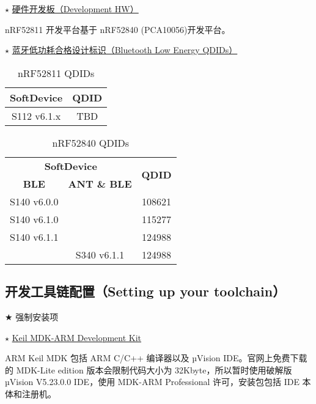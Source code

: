 \documentclass{WHUResearch}  %
\begin{document}
$\star$ \href{https://infocenter.nordicsemi.com/index.jsp?topic=\%2Fcomp_matrix_nrf52811\%2FCOMP\%2Fnrf52811\%2Fnrf52811_ble_qdid_qual_matrix.html&cp=3_2_2_4}{硬件开发板（Development HW）}

 nRF52811 开发平台基于 nRF52840 (PCA10056)开发平台。

$\star$ \href{https://infocenter.nordicsemi.com/index.jsp?topic=\%2Fcomp_matrix_nrf52811\%2FCOMP\%2Fnrf52811\%2Fnrf52811_ble_qdid_qual_matrix.html&cp=3_2_2_4}{蓝牙低功耗合格设计标识（Bluetooth Low Energy QDIDs）}
\begin{table}[htbp]
  \centering
  \caption{nRF52811 QDIDs}
	\begin{tabular}{|c|c|}
	\hline
  	\textbf{SoftDevice	} & \textbf{QDID} \\ \hline
  	S112 v6.1.x   	     & TBD \\ \hline
	\end{tabular}
\end{table}

\begin{table}[htbp]
  \centering
  \caption{nRF52840 QDIDs}
	\begin{tabular}{|c|c|c|}
	\hline
	\multicolumn{2}{|c|}{\textbf{SoftDevice}} & \multirow{2}{*}{\textbf{QDID}} \\ \cline{1-2}
  			 \textbf{BLE} & \textbf{ANT \& BLE} &                   \\ \hline
  			 S140 v6.0.0	& \multirow{3}{*}{}  & 108621 \\ \cline{1-1} \cline{3-3} 
  			 S140 v6.1.0	&                    & 115277 \\ \cline{1-1} \cline{3-3} 
  			 S140 v6.1.1	&                    & 124988 \\ \hline
  							& S340 v6.1.1 		  & 124988 \\ \hline
	\end{tabular}
\end{table}

\subsection{开发工具链配置（Setting up your toolchain）}

$\bigstar$ 强制安装项

$\star$ \href{http://www2.keil.com/mdk5/}{Keil MDK-ARM Development Kit}

ARM Keil MDK 包括 ARM C/C++ 编译器以及 µVision IDE。官网上免费下载的 MDK-Lite edition 版本会限制代码大小为 32Kbyte，所以暂时使用破解版µVision V5.23.0.0 IDE，使用 MDK-ARM Professional 许可，安装包包括 IDE 本体和注册机。
\end{document}
